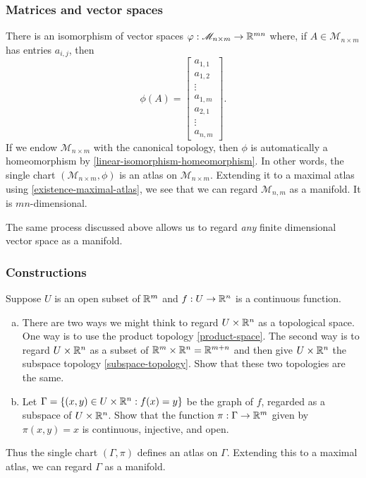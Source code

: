 \subsubsection*{Matrices and vector spaces}

\begin{example}[Matrices]
	There is an isomorphism of vector spaces $\varphi : \mathscr{M}_{n \times m} \to \mathbb{R}^{mn}$ where, if $A \in \mathscr{M}_{n \times m}$ has entries $a_{i,j}$, then
	\[ \phi(A) = \begin{bmatrix} a_{1,1} \\ a_{1,2} \\ \vdots \\ a_{1,m} \\ a_{2,1} \\ \vdots \\ a_{n,m} \end{bmatrix}. \]
	If we endow $\mathscr{M}_{n \times m}$ with the canonical topology, then $\phi$ is automatically a homeomorphism by \cref{linear-isomorphism-homeomorphism}. In other words, the single chart $(\mathscr{M}_{n \times m}, \phi)$ is an atlas on $\mathscr{M}_{n \times m}$. Extending it to a maximal atlas using \cref{existence-maximal-atlas}, we see that we can regard $\mathscr{M}_{n,m}$ as a manifold. It is $mn$-dimensional.  
\end{example}

The same process discussed above allows us to regard \emph{any} finite dimensional vector space as a manifold. 

\subsubsection*{Constructions}

\begin{exercise} \label{graphs-continuous}
	Suppose $U$ is an open subset of $\mathbb{R}^m$ and $f : U \to \mathbb{R}^n$ is a continuous function. 
	\begin{enumerate}[(a)]
		\item There are two ways we might think to regard $U \times \mathbb{R}^n$ as a topological space. One way is to use the product topology \ref{product-space}. The second way is to regard $U \times \mathbb{R}^n$ as a subset of $\mathbb{R}^m \times \mathbb{R}^n = \mathbb{R}^{m+n}$ and then give $U \times \mathbb{R}^n$ the subspace topology \ref{subspace-topology}. Show that these two topologies are the same. 
		
		\item Let $\Gamma = \{ (x,y) \in U \times \mathbb{R}^n : f(x) = y \}$ be the graph of $f$, regarded as a subspace of $U \times \mathbb{R}^n$. Show that the function $\pi : \Gamma \to \mathbb{R}^m$ given by $\pi(x,y) = x$ is continuous, injective, and open. 
	\end{enumerate}
	Thus the single chart $(\Gamma, \pi)$ defines an atlas on $\Gamma$. Extending this to a maximal atlas, we can regard $\Gamma$ as a manifold. 
\end{exercise}

